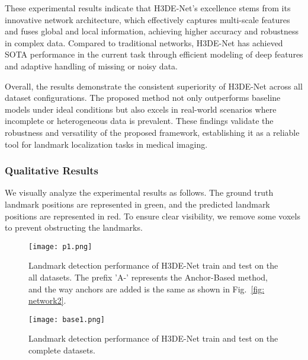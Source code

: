 These experimental results indicate that H3DE-Net's excellence stems from its innovative network architecture, which effectively captures multi-scale features and fuses global and local information, achieving higher accuracy and robustness in complex data. Compared to traditional networks, H3DE-Net has achieved SOTA performance in the current task through efficient modeling of deep features and adaptive handling of missing or noisy data.

Overall, the results demonstrate the consistent superiority of H3DE-Net across all dataset configurations. The proposed method not only outperforms baseline models under ideal conditions but also excels in real-world scenarios where incomplete or heterogeneous data is prevalent. These findings validate the robustness and versatility of the proposed framework, establishing it as a reliable tool for landmark localization tasks in medical imaging.



\subsubsection{Qualitative Results}
We visually analyze the experimental results as follows. The ground truth landmark positions are represented in green, and the predicted landmark positions are represented in red. To ensure clear visibility, we remove some voxels to prevent obstructing the landmarks.
\begin{figure*}[htbp]
\centering
\begin{minipage}{\textwidth}
  \centering
  \texttt{[image: p1.png]}
  \caption{Landmark detection performance of H3DE-Net train and test on the all datasets. The prefix 'A-' represents the Anchor-Based method, and the way anchors are added is the same as shown in Fig.~\ref{fig: network2}.}
  \label{fig: p}
\end{minipage}
\end{figure*}


\begin{figure*}[htbp]
\centering
\begin{minipage}{\textwidth}
  \centering
  \texttt{[image: base1.png]}
  \caption{Landmark detection performance of H3DE-Net train and test on the complete datasets. }
  \label{fig: base}
\end{minipage}
\end{figure*}


